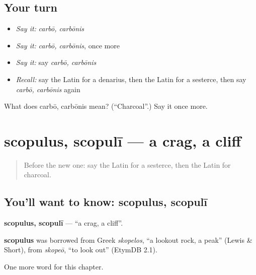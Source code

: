 \subsection*{Your turn}
\begin{itemize}
\raggedright
  \item \emph{Say it:} \emph{carbō, carbōnis}
  \item \emph{Say it:} \emph{carbō, carbōnis}, once more
  \item \emph{Say it:} say \emph{carbō, carbōnis}
  \item \emph{Recall:} say the Latin for a denarius, then the Latin for a sesterce, then say \emph{carbō, carbōnis} again
\end{itemize}

\begin{tcolorbox}[breakable,colback=teal!4,colframe=teal!35!black,title={Before you move on}]
What does carbō, carbōnis mean? (\textquotedblleft{}Charcoal\textquotedblright{}.) Say it once more.
\end{tcolorbox}
\section[scopulus, scopulī]{scopulus, scopulī — a crag, a cliff}

\label{lesson:LA-C191-scopulus}



\begin{quote}
Before the new one: say the Latin for a sesterce, then the Latin for charcoal.
\end{quote}

\subsection*{You'll want to know: scopulus, scopulī}
\textbf{scopulus, scopulī} — \textquotedblleft{}a crag, a cliff\textquotedblright{}.

\begin{cousinweb}
\textbf{scopulus} was borrowed from Greek \emph{skopelos}, \textquotedblleft{}a lookout rock, a peak\textquotedblright{} (Lewis \& Short), from \emph{skopeō}, \textquotedblleft{}to look out\textquotedblright{} (EtymDB 2.1).
\end{cousinweb}

\begin{grammarlens}[title={What you've built}]
One more word for this chapter.
\end{grammarlens}


